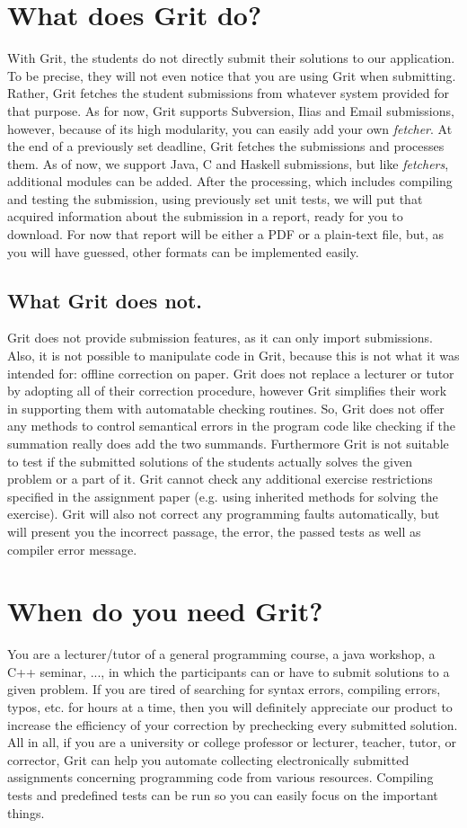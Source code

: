 \documentclass[10pt,a4paper, titlepage, toc=idx]{scrreprt}
\theoremstyle{definition}
\theoremstyle{plain}
\newcommand*{\product}{Grit}
\begin{document}
\section{What does \product{} do?}
With \product, the students do not directly submit their solutions to
our application. To be precise, they will not even notice that you are
using \product{} when submitting. Rather, \product{} fetches the student
submissions from whatever system provided for that purpose. As for
now, \product{} supports Subversion, Ilias and Email submissions,
however, because of its high modularity, you can easily add your own
{\it fetcher}. At the end of a previously set deadline,
\product{} fetches the submissions and processes them. As of now, we
support Java, C and Haskell submissions, but like {\it fetchers},
additional modules can be added. After the processing, which includes
compiling and testing the submission, using previously set unit tests,
we will put that acquired information about the submission in a
report, ready for you to download. For now that report will be either
a PDF or a plain-text file, but, as you will have guessed, other
formats can be implemented easily.
\subsection*{What \product{} does not.}
\product{} does not provide submission features, as it can only import
submissions. Also, it is not possible to manipulate code in \product,
because this is not what it was intended for: offline correction on
paper.  \product{} does not replace a lecturer or tutor by adopting all
of their correction procedure, however \product{} simplifies their work
in supporting them with automatable checking routines. So,
\product{} does not offer any methods to control semantical errors in
the program code like checking if the summation really does add the
two summands.  Furthermore \product{} is not suitable to test if the
submitted solutions of the students actually solves the given problem or
a part of it. \product{} cannot check any additional exercise
restrictions specified in the assignment paper (e.g. using inherited
methods for solving the exercise). \product{} will also not correct any
programming faults automatically, but will present you the incorrect
passage, the error, the passed tests as well as compiler
error message.
\section{When do you need \product?}
You are a lecturer/tutor of a general programming course, a java
workshop, a C++ seminar, ..., in which the participants can or have to
submit solutions to a given problem. If you are tired of searching for
syntax errors, compiling errors, typos, etc. for hours at a time, then
you will definitely appreciate our product to increase the efficiency
of your correction by prechecking every submitted solution. All in
all, if you are a university or college professor or lecturer,
teacher, tutor, or corrector, \product{} can help you automate
collecting electronically submitted assignments concerning programming
code from various resources. Compiling tests and predefined tests can
be run so you can easily focus on the important things.
\end{document}

